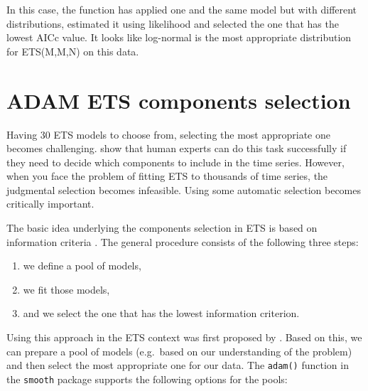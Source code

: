 \documentclass[
]{book}
\providecommand{\tightlist}{%
  \setlength{\itemsep}{0pt}\setlength{\parskip}{0pt}}
\theoremstyle{definition}
\theoremstyle{definition}
\theoremstyle{definition}
\theoremstyle{definition}
\theoremstyle{remark}
\begin{document}
In this case, the function has applied one and the same model but with different distributions, estimated it using likelihood and selected the one that has the lowest AICc value. It looks like log-normal is the most appropriate distribution for ETS(M,M,N) on this data.

\hypertarget{ETSSelection}{%
\section{ADAM ETS components selection}\label{ETSSelection}}

Having 30 ETS models to choose from, selecting the most appropriate one becomes challenging. \citet{Petropoulos2018a} show that human experts can do this task successfully if they need to decide which components to include in the time series. However, when you face the problem of fitting ETS to thousands of time series, the judgmental selection becomes infeasible. Using some automatic selection becomes critically important.

The basic idea underlying the components selection in ETS is based on information criteria \citep[Section 13.3 of][]{SvetunkovSBA}. The general procedure consists of the following three steps:

\begin{enumerate}
\def\labelenumi{\arabic{enumi}.}
\tightlist
\item
  we define a pool of models,
\item
  we fit those models,
\item
  and we select the one that has the lowest information criterion.
\end{enumerate}

Using this approach in the ETS context was first proposed by \citet{Hyndman2002}. Based on this, we can prepare a pool of models (e.g.~based on our understanding of the problem) and then select the most appropriate one for our data. The \texttt{adam()} function in the \texttt{smooth} package supports the following options for the pools:
\end{document}
